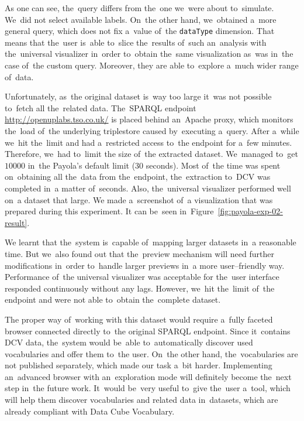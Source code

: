 As one can see, the~query differs from the~one we~were about to~simulate. We~did not select available labels. On~the other hand, we~obtained a~more general 
query, which does not fix a~value of~the \texttt{dataType} dimension. That means 
that the~user is~able to~slice the~results of~such an~analysis with the~universal 
visualizer in~order to~obtain the~same visualization as~was in~the case of~the custom 
query. Moreover, they are able to~explore a~much wider range of~data.  

\begin{sloppypar}
Unfortunately, as~the original dataset is~way too large it~was not possible to~fetch all the~related data. The~SPARQL endpoint \mbox{\url{http://openuplabs.tso.co.uk/}}
is placed behind an~Apache proxy, which monitors the~load of~the underlying 
triplestore caused by~executing a~query. After a~while we~hit the~limit and had a~restricted access to~the endpoint for a~few minutes. Therefore, we~had to~limit 
the size of~the extracted dataset. We~managed to~get $10000$ in~the Payola's 
default limit (30 seconds). Most of~the time was spent on~obtaining all the~data from the~endpoint, the~extraction to~DCV was completed in~a matter of~seconds. Also, the~universal visualizer performed well on~a dataset that large.
We made a~screenshot of~a visualization that was prepared during this experiment.
It can be~seen in~Figure~\ref{fig:payola-exp-02-result}.
\end{sloppypar}

We learnt that the~system is~capable of~mapping larger datasets in~a reasonable 
time. But we~also found out that the~preview mechanism will need further 
modifications in~order to~handle larger previews in~a more user--friendly way. 
Performance of~the universal visualizer was acceptable for the~user interface 
responded continuously without any lags. However, we~hit the~limit of~the 
endpoint and were not able to~obtain the~complete dataset. 

The proper way of~working with this dataset would require a~fully faceted 
browser connected directly to~the original SPARQL endpoint. Since it~contains 
DCV data, the~system would be~able to~automatically discover used vocabularies 
and offer them to~the user. On~the other hand, the~vocabularies are not published
separately, which made our task a~bit harder. Implementing an~advanced browser
with an~exploration mode will definitely become the~next step in~the future work. It~would be~very useful to~give the~user a~tool, which will help them 
discover vocabularies and related data in~datasets, which are already compliant 
with Data Cube Vocabulary.

